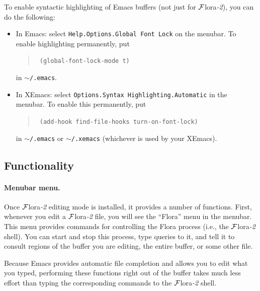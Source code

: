 \documentclass[11pt]{article}
\newcommand{\FLORA}{{\mbox{\sc ${\cal F}${lora}\rm\emph{-2}}}\xspace}
\newcommand{\FLSYSTEM}{\FLORA}
\begin{document}
{To enable syntactic highlighting of Emacs buffers (not just for \FLSYSTEM), you can do the following:
\begin{itemize}
  \item  {\sf In Emacs:} select {\tt Help.Options.Global Font Lock} on
    the menubar.  To enable highlighting permanently, put 
    \begin{quote}
      \tt
      (global-font-lock-mode t)
    \end{quote}
    in  \texttt{\ensuremath{\sim}/.emacs}.
  \item {\sf In XEmacs:} select {\tt Options.Syntax
        Highlighting.Automatic} in the menubar. To enable this permanently, put
      \begin{quote}
        \tt
        (add-hook \textquotesingle{}find-file-hooks \textquotesingle{}turn-on-font-lock)
      \end{quote}
      in  \texttt{\ensuremath{\sim}/.emacs} or  \texttt{\ensuremath{\sim}/.xemacs} (whichever is used by your
      XEmacs).
\end{itemize}


\subsection{Functionality}


\paragraph{Menubar menu.}
Once \FLSYSTEM editing mode is installed, it provides a number of functions.
First, whenever you edit a \FLSYSTEM file, you will see the ``Flora'' menu
in the menubar. This menu provides commands for controlling the Flora
process (i.e., the \FLSYSTEM shell). You can start and stop
this process, type queries to it, and tell it to consult regions of
the buffer you are editing, the entire buffer, or some other file.

Because Emacs provides automatic file completion and allows you to edit
what you typed, performing these functions right out of the buffer takes
much less effort than typing the corresponding commands to the \FLSYSTEM
shell.

}
\end{document}
